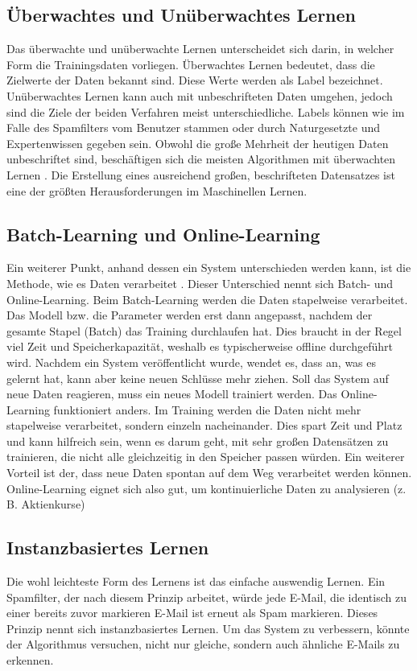 \subsection{Überwachtes und Unüberwachtes Lernen}
Das überwachte und unüberwachte Lernen unterscheidet
sich darin, in welcher Form die Trainingsdaten vorliegen.
Überwachtes Lernen bedeutet, dass die Zielwerte der Daten bekannt
sind. Diese Werte werden als Label bezeichnet. Unüberwachtes Lernen
kann auch mit unbeschrifteten Daten umgehen, jedoch sind die Ziele
der beiden Verfahren meist unterschiedliche.
Labels können wie im Falle des
Spamfilters vom Benutzer stammen oder durch Naturgesetzte und Expertenwissen
gegeben sein. Obwohl die große Mehrheit der heutigen Daten unbeschriftet sind,
beschäftigen sich die meisten Algorithmen mit überwachten Lernen
\parencite[235]{book:hands-on-ml}.
Die Erstellung eines ausreichend großen, beschrifteten Datensatzes
ist eine der größten Herausforderungen im Maschinellen Lernen.

\subsection{Batch-Learning und Online-Learning}
Ein weiterer Punkt, anhand dessen ein System unterschieden
werden kann, ist die Methode, wie es Daten verarbeitet \parencite[15]{book:hands-on-ml}.
Dieser Unterschied nennt sich Batch- und Online-Learning.
Beim Batch-Learning werden die Daten stapelweise verarbeitet.
Das Modell bzw. die Parameter werden erst dann angepasst,
nachdem der gesamte Stapel (Batch) das Training durchlaufen hat.
Dies braucht in der Regel viel Zeit und Speicherkapazität, weshalb
es typischerweise offline durchgeführt wird.
Nachdem ein System veröffentlicht wurde, wendet es, dass an, was es gelernt hat,
kann aber keine neuen Schlüsse mehr ziehen.
Soll das System auf neue Daten reagieren, muss ein neues Modell trainiert werden.
Das Online-Learning funktioniert anders.
Im Training werden die Daten nicht mehr stapelweise verarbeitet,
sondern einzeln nacheinander.
Dies spart Zeit und Platz und kann hilfreich sein, wenn es darum geht,
mit sehr großen Datensätzen zu trainieren, die nicht alle gleichzeitig
in den Speicher passen würden.
Ein weiterer Vorteil ist der, dass neue Daten spontan auf dem Weg
verarbeitet werden können. Online-Learning eignet sich also gut,
um kontinuierliche Daten zu analysieren (z.\,B. Aktienkurse)

\subsection{Instanzbasiertes Lernen}
Die wohl leichteste Form des Lernens ist das einfache auswendig Lernen.
Ein Spamfilter, der nach diesem Prinzip arbeitet, würde jede E-Mail,
die identisch zu einer bereits zuvor markieren E-Mail ist erneut als Spam markieren.
Dieses Prinzip nennt sich instanzbasiertes Lernen. Um das System zu
verbessern, könnte der Algorithmus versuchen, nicht nur gleiche,
sondern auch ähnliche E-Mails zu erkennen.
